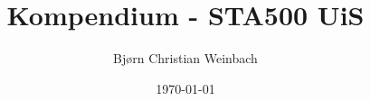 \documentclass[10pt, a4paper, nynorsk]{report}          %
\title{Kompendium - STA500 UiS}                     %
\author{Bjørn Christian Weinbach}                   %
\date{\today}                                       %
\begin{document}
    
\maketitle                                          %

\begin{abstract}                                    %
\end{abstract}






\end{document}
